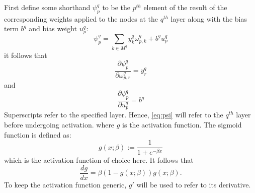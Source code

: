 \documentclass{article}
\begin{document}
First define some shorthand $\psi_p^q$ to be the $p^{th}$ element of the result of the corresponding weights applied to the nodes at the $q^{th}$ layer along with the bias term $b^q$ and bias weight $u_p^q$:
%
\begin{equation} \label{eq:psi}
\psi_p^q = \sum_{k \in M^q} y_k^q \omega_{p,k}^q + b^q u_p^q
\end{equation}
%
it follows that
%
\begin{equation} \label{eq:dpsi_w}
\frac{\partial \psi_p^q}{\partial \omega_{p,r}^q} =
y_r^q
\end{equation}
%
and
%
\begin{equation} \label{eq:dpsi_u}
\frac{\partial \psi_p^q}{\partial u_p^q} =
b^q
\end{equation}
%
%
Superscripts refer to the specified layer.
Hence, \eqref{eq:psi} will refer to the $q^{th}$ layer before undergoing activation.
%
where $g$ is the activation function. The sigmoid function is defined as:
%
\begin{equation} \label{eq:g}
g(x;\beta) := \frac{1}{1 + e^{-\beta x}}
\end{equation}
%
which is the activation function of choice here.
It follows that
%
\begin{equation} \label{eq:gp}
\frac{d g}{d x} = \beta \left( 1 - g(x;\beta) \right) g(x; \beta).
\end{equation}
%
To keep the activation function generic, $g'$ will be used to refer to its derivative.
\end{document}
